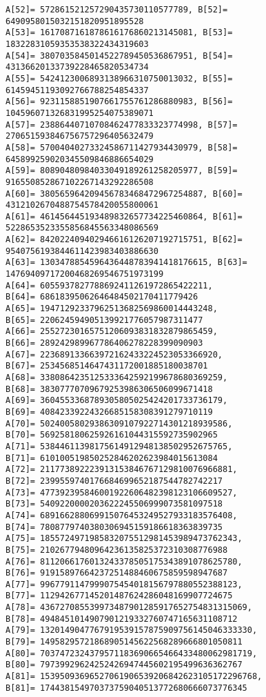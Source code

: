 \documentclass[a4paper]{article}
\begin{document}
\begin{verbatim}
A[52]= 572861521257290435730110577789, B[52]= 6490958015032151820951895528
A[53]= 1617087161878616176860213145081, B[53]= 18322831059353538322434319603
A[54]= 3807035845014522789450536867951, B[54]= 43136620133739228465820534734
A[55]= 5424123006893138966310750013032, B[55]= 61459451193092766788254854337
A[56]= 9231158851907661755761286880983, B[56]= 104596071326831995254075389071
A[57]= 23886440710708462477833323774998, B[57]= 270651593846756757296405632479
A[58]= 57004040273324586711427934430979, B[58]= 645899259020345509846886654029
A[59]= 80890480984033049189261258205977, B[59]= 916550852867102267143292286508
A[60]= 380565964209456783468472967254887, B[60]= 4312102670488754578420055800061
A[61]= 461456445193489832657734225460864, B[61]= 5228653523355856845563348086569
A[62]= 842022409402946616126207192715751, B[62]= 9540756193844611423983403886630
A[63]= 1303478854596436448783941418176615, B[63]= 14769409717200468269546751973199
A[64]= 6055937827788692411261972865422211, 
B[64]= 68618395062646484502170411779426
A[65]= 19471292337962513682569860014443248, 
B[65]= 220624594905139921776057987311477
A[66]= 25527230165751206093831832879865459, 
B[66]= 289242989967786406278228399090903
A[67]= 223689133663972162433224523053366920, 
B[67]= 2534568514647431172001885180038701
A[68]= 3380864235125333642592199678680369259, 
B[68]= 38307770709679253986306506099671418
A[69]= 3604553368789305805025424201733736179, 
B[69]= 40842339224326685158308391279710119
A[70]= 50240058029386309107922714301218939586, 
B[70]= 569258180625926161044315592735902965
A[71]= 53844611398175614912948138502952675765, 
B[71]= 610100519850252846202623984015613084
A[72]= 211773892223913153846767129810076966881, 
B[72]= 2399559740176684699652187544782742217
A[73]= 477392395846001922606482398123106609527, 
B[73]= 5409220000203622245506999073581097518
A[74]= 689166288069915076453249527933183576408, 
B[74]= 7808779740380306945159186618363839735
A[75]= 1855724971985832075512981453989473762343, 
B[75]= 21026779480964236135825372310308776988
A[76]= 8112066176013243378505175343891078625780, 
B[76]= 91915897664237251488460675859598947687
A[77]= 9967791147999075454018156797880552388123, 
B[77]= 112942677145201487624286048169907724675
A[78]= 436727085539973487901285917652754831315069, 
B[78]= 4948451014907901219332760747165631108712
A[79]= 1320149047767919539157875909756145046333330, 
B[79]= 14958295721868905145622568289666801050811
A[80]= 7037472324379571183690665466433480062981719, 
B[80]= 79739929624252426947445602195499636362767
A[81]= 15395093696527061906539206842623105172296768, 
B[81]= 174438154970373759040513772680666073776345

\end{verbatim}
\end{document}
